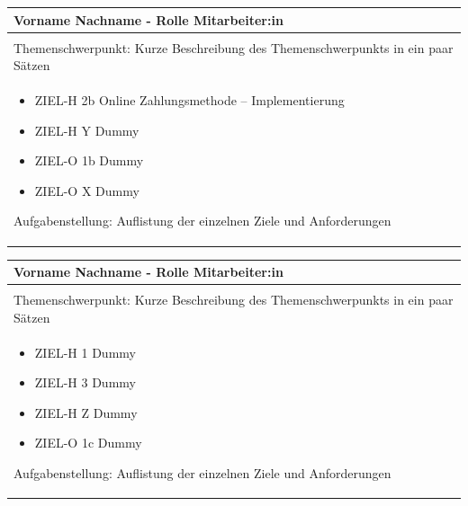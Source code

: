 \documentclass[
	headings=optiontotocandhead,%
	oneside,
	numbers=noenddot,%
	toc=flat, %
	10pt, %
	parskip=full, %
	listof=totoc, %
	listof=flat, %
	numbers=noenddot, %
	bibliography=totoc, %
	a4paper,DIV=14,
]{scrartcl}
\begin{document}
\begin{table}[H]
	\begin{tabularx} {\textwidth} {
			|>{\hsize=1\hsize}X|
		}
		
		\hline
		\rowcolor[HTML]{D9D9D9} 
		\rule{0pt}{15pt}
		\textbf{\normalsize{Vorname Nachname - Rolle Mitarbeiter:in}} \\ \hline
		
		\rule{0pt}{20pt} \\
		\rule{0pt}{11pt}\textcolor[HTML]{A6A6A6}{\footnotesize{Themenschwerpunkt: Kurze Beschreibung des Themenschwerpunkts in ein paar Sätzen}} \\ \hline
		
		\begin{itemize}[itemsep=0pt, parsep=0pt, topsep=0pt]
			\item{ZIEL-H 2b Online Zahlungsmethode – Implementierung}
			\item{ZIEL-H Y Dummy}
			\item{ZIEL-O 1b Dummy}
			\item{ZIEL-O X Dummy}
		\end{itemize}
		
		\rule{0pt}{11pt}\textcolor[HTML]{A6A6A6}{\footnotesize{Aufgabenstellung: Auflistung der einzelnen Ziele und Anforderungen}} \\ \hline
	\end{tabularx}
\end{table}

\begin{table}[H]
	\begin{tabularx} {\textwidth} {
			|>{\hsize=1\hsize}X|
		}
		
		\hline
		\rowcolor[HTML]{D9D9D9} 
		\rule{0pt}{15pt}
		\textbf{\normalsize{Vorname Nachname - Rolle Mitarbeiter:in}} \\ \hline
		
		\rule{0pt}{20pt} \\
		\rule{0pt}{11pt}\textcolor[HTML]{A6A6A6}{\footnotesize{Themenschwerpunkt: Kurze Beschreibung des Themenschwerpunkts in ein paar Sätzen}} \\ \hline
		
		\begin{itemize}[itemsep=0pt, parsep=0pt, topsep=0pt]
			\item{ZIEL-H 1 Dummy}
			\item{ZIEL-H 3 Dummy}
			\item{ZIEL-H Z Dummy}
			\item{ZIEL-O 1c Dummy}
		\end{itemize}
		
		\rule{0pt}{11pt}\textcolor[HTML]{A6A6A6}{\footnotesize{Aufgabenstellung: Auflistung der einzelnen Ziele und Anforderungen}} \\ \hline
	\end{tabularx}
\end{table}
\end{document}
